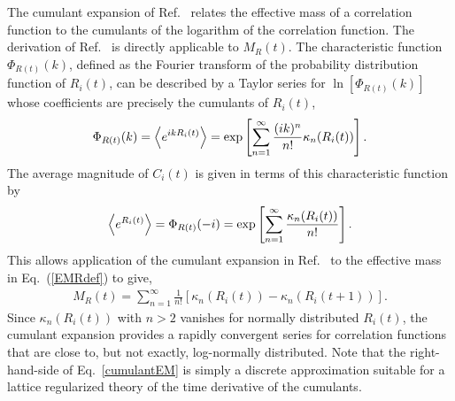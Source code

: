 The cumulant expansion of Ref.~\cite{Endres:2011jm} relates the effective mass of a correlation function to the cumulants 
of the logarithm of the correlation function. The derivation of Ref.~\cite{Endres:2011jm} is directly applicable to $M_R(t)$. 
The characteristic function $\Phi_{R(t)}(k)$, defined as the Fourier transform of the probability distribution function of $R_i(t)$, 
can be described by a Taylor series for $\ln[\Phi_{R(t)}(k)]$ whose coefficients are precisely the cumulants of $R_i(t)$,
%
\begin{equation}
  \begin{split}
    \Phi_{R(t)}(k) = \left< e^{i k R_i(t)} \right> = \exp\left[\sum_{n=1}^\infty \frac{(ik)^n}{n!}\kappa_n(R_i(t))\right].
  \end{split}
  \label{cumulants}
\end{equation}
%
The average magnitude of $C_i(t)$ is given in terms of this characteristic function by
%
\begin{equation}
  \begin{split}
    \left< e^{R_i(t)} \right> = \Phi_{R(t)}(-i) = \exp\left[\sum_{n=1}^\infty \frac{\kappa_n(R_i(t))}{n!}\right].
  \end{split}
  \label{cumulantR}
\end{equation}
%
This allows application of the cumulant expansion in Ref.~\cite{Endres:2011jm} 
to the effective mass in Eq.~(\ref{EMRdef}) to give,
%
\begin{equation}
  \begin{split}
    M_R(t) = \sum_{n=1}^\infty \frac{1}{n!}\left[ \kappa_n(R_i(t)) - \kappa_n(R_i(t+1)) \right].
  \end{split}
  \label{cumulantEM}
\end{equation}
%
Since $\kappa_n(R_i(t))$ with $n >2$ vanishes for normally distributed $R_i(t)$, the cumulant expansion provides a rapidly 
convergent series for correlation functions that are close to, but not exactly, log-normally distributed. 
Note that the right-hand-side of Eq.~\eqref{cumulantEM} is simply a discrete approximation suitable for a lattice regularized 
theory of the time derivative of the cumulants.


